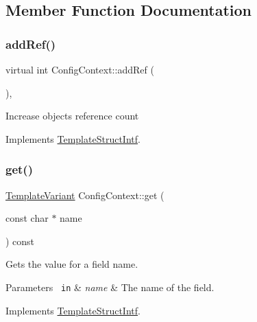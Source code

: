 \subsection{Member Function Documentation}
\mbox{\label{class_config_context_a6e870043f96de613f7f00e10aa57359e}} 
\subsubsection{\texorpdfstring{addRef()}{addRef()}}
{\footnotesize\ttfamily virtual int Config\+Context\+::add\+Ref (\begin{DoxyParamCaption}{ }\end{DoxyParamCaption})\hspace{0.3cm}{\ttfamily [inline]}, {\ttfamily [virtual]}}

Increase object\textquotesingle{}s reference count 

Implements \mbox{\hyperlink{class_template_struct_intf_a05fe97ad47633beb326f69686faed581}{Template\+Struct\+Intf}}.

\mbox{\label{class_config_context_aa961d7f2814f0160b8eb3ddc52c18ddd}} 
\subsubsection{\texorpdfstring{get()}{get()}}
{\footnotesize\ttfamily \mbox{\hyperlink{class_template_variant}{Template\+Variant}} Config\+Context\+::get (\begin{DoxyParamCaption}\item[{const char $\ast$}]{name }\end{DoxyParamCaption}) const\hspace{0.3cm}{\ttfamily [virtual]}}

Gets the value for a field name. 
\begin{DoxyParams}[1]{Parameters}
\mbox{\texttt{ in}}  & {\em name} & The name of the field. \\
\hline
\end{DoxyParams}


Implements \mbox{\hyperlink{class_template_struct_intf_a3d610cb81b4adbb531ebed3aa3d09b51}{Template\+Struct\+Intf}}.

\mbox{\label{class_config_context_a56eb8523197fa488cb099b47808b7ba7}} 
